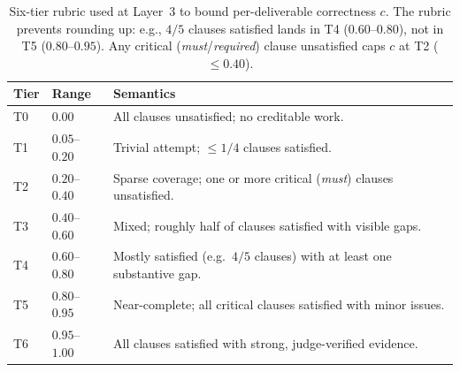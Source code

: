 \documentclass{llmxive}
\providecommand{\arraystretch}{1.2}
\begin{document}
\begin{table}[!htbp]
\centering
\footnotesize
\setlength{\tabcolsep}{4pt}
\renewcommand{\arraystretch}{1.2}
\begin{tabular}{@{}l l p{4.2cm}@{}}
\toprule
\textbf{Tier} & \textbf{Range} & \textbf{Semantics} \\
\midrule
T0 & $0.00$            & All clauses unsatisfied; no creditable work. \\
T1 & $0.05$--$0.20$    & Trivial attempt; $\leq 1/4$ clauses satisfied. \\
T2 & $0.20$--$0.40$    & Sparse coverage; one or more critical (\emph{must}) clauses unsatisfied. \\
T3 & $0.40$--$0.60$    & Mixed; roughly half of clauses satisfied with visible gaps. \\
T4 & $0.60$--$0.80$    & Mostly satisfied (e.g.\ $4/5$ clauses) with at least one substantive gap. \\
T5 & $0.80$--$0.95$    & Near-complete; all critical clauses satisfied with minor issues. \\
T6 & $0.95$--$1.00$    & All clauses satisfied with strong, judge-verified evidence. \\
\bottomrule
\end{tabular}
\caption{Six-tier rubric used at Layer~3 to bound per-deliverable correctness $c$. The rubric prevents rounding up: e.g., $4/5$ clauses satisfied lands in T4 ($0.60$--$0.80$), not in T5 ($0.80$--$0.95$). Any critical (\emph{must}/\emph{required}) clause unsatisfied caps $c$ at T2 ($\leq 0.40$).}
\label{tab:rubric}
\end{table}
\end{document}
